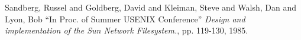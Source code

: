 
\begin{thebibliography}{9}
\small  %

Sandberg, Russel and Goldberg, David and Kleiman, Steve and Walsh, Dan and Lyon, Bob
``In Proc. of Summer USENIX Conference''
{\em Design and implementation of the Sun Network Filesystem.}, pp. 119-130, 1985.

\end{thebibliography}
